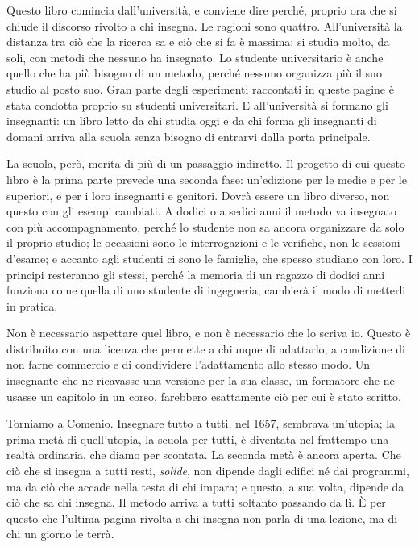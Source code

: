 Questo libro comincia dall'università, e conviene dire perché, proprio
ora che si chiude il discorso rivolto a chi insegna. Le ragioni sono
quattro. All'università la distanza tra ciò che la ricerca sa e ciò
che si fa è massima: si studia molto, da soli, con metodi che nessuno
ha insegnato. Lo studente universitario è anche quello che ha più
bisogno di un metodo, perché nessuno organizza più il suo studio al
posto suo. Gran parte degli esperimenti raccontati in queste pagine è
stata condotta proprio su studenti universitari. E all'università si
formano gli insegnanti: un libro letto da chi studia oggi e da chi
forma gli insegnanti di domani arriva alla scuola senza bisogno di
entrarvi dalla porta principale.

La scuola, però, merita di più di un passaggio indiretto. Il progetto
di cui questo libro è la prima parte prevede una seconda fase:
un'edizione per le medie e per le superiori, e per i loro insegnanti
e genitori. Dovrà essere un libro diverso, non questo con gli esempi
cambiati. A dodici o a sedici anni il metodo va insegnato con più
accompagnamento, perché lo studente non sa ancora organizzare da solo
il proprio studio; le occasioni sono le interrogazioni e le verifiche,
non le sessioni d'esame; e accanto agli studenti ci sono le famiglie,
che spesso studiano con loro. I principi resteranno gli stessi, perché
la memoria di un ragazzo di dodici anni funziona come quella di uno
studente di ingegneria; cambierà il modo di metterli in pratica.

Non è necessario aspettare quel libro, e non è necessario che lo
scriva io. Questo è distribuito con una licenza che permette a
chiunque di adattarlo, a condizione di non farne commercio e di
condividere l'adattamento allo stesso modo. Un insegnante che ne
ricavasse una versione per la sua classe, un formatore che ne usasse
un capitolo in un corso, farebbero esattamente ciò per cui è stato
scritto.

\asterismo

Torniamo a Comenio. Insegnare tutto a tutti, nel 1657, sembrava
un'utopia; la prima metà di quell'utopia, la scuola per tutti, è
diventata nel frattempo una realtà ordinaria, che diamo per scontata.
La seconda metà è ancora aperta. Che ciò che si insegna a tutti
resti, \emph{solide}, non dipende dagli edifici né dai programmi, ma
da ciò che accade nella testa di chi impara; e questo, a sua volta,
dipende da ciò che sa chi insegna. Il metodo arriva a tutti soltanto
passando da lì. È per questo che l'ultima pagina rivolta a chi insegna
non parla di una lezione, ma di chi un giorno le terrà.

